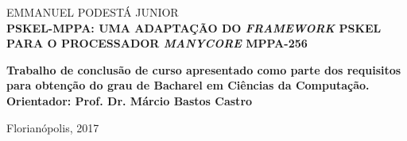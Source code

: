 
\begin{center}

    {\large EMMANUEL PODESTÁ JUNIOR\\}
    \vspace{8cm}
    {\Large \textsc\textbf{{PSKEL-MPPA: UMA ADAPTAÇÃO DO \textit{FRAMEWORK} PSKEL PARA O PROCESSADOR \textit{MANYCORE} MPPA-256} }\\}
    \vspace{1cm}
    \hspace{.45\linewidth}
    \begin{minipage}{.50\linewidth}

            \textbf{Trabalho de conclusão de curso apresentado como parte dos requisitos para obtenção do grau de Bacharel em Ciências da Computação.\\
            Orientador: Prof. Dr. Márcio Bastos Castro}

           
    
    \end{minipage}

    \vspace{2cm}
    \vfill
    {\large Florianópolis, 2017}
\end{center}

